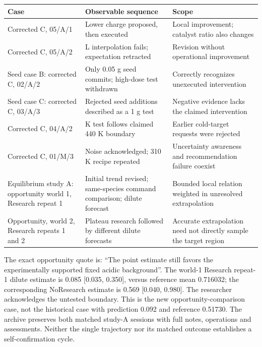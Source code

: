 \documentclass[10pt,a4paper]{article}
\begin{document}
{\def\LTcaptype{table} %
\small\begin{longtable}[]{@{}
  >{\raggedright\arraybackslash}p{}
  >{\raggedright\arraybackslash}p{}
  >{\raggedright\arraybackslash}p{}@{}}
\toprule\noalign{}
\begin{minipage}[b]{\linewidth}\raggedright
Case
\end{minipage} & \begin{minipage}[b]{\linewidth}\raggedright
Observable sequence
\end{minipage} & \begin{minipage}[b]{\linewidth}\raggedright
Scope
\end{minipage} \\
\midrule\noalign{}
\endhead
\bottomrule\noalign{}
\endlastfoot
Corrected C, 05/A/1 & Lower charge proposed, then executed & Local improvement; catalyst ratio also changes \\
Corrected C, 05/A/2 & 0.065 L interpolation fails; expectation retracted & Revision without operational improvement \\
Seed case B: corrected C, 02/A/2 & Only 0.05 g seed commits; high-dose test withdrawn & Correctly recognizes unexecuted intervention \\
Seed case C: corrected C, 03/A/3 & Rejected seed additions described as a 1 g test & Negative evidence lacks the claimed intervention \\
Corrected C, 04/A/2 & 430 K test follows claimed 440 K boundary & Earlier cold-target requests were rejected \\
Corrected C, 01/M/3 & Noise acknowledged; 310 K recipe repeated & Uncertainty awareness and recommendation failure coexist \\
Equilibrium study A: opportunity world 1, Research repeat 1 & Initial trend revised; same-species command comparison; dilute forecast & Bounded local relation weighted in unresolved extrapolation \\
Opportunity, world 2, Research repeats 1 and 2 & Plateau research followed by different dilute forecasts & Accurate extrapolation need not directly sample the target region \\
\end{longtable}\normalsize
}

The exact opportunity quote is: ``The point estimate still favors the experimentally supported fixed acidic background''. The world-1 Research repeat-1 dilute estimate is 0.085 {[}0.035, 0.350{]}, versus reference mean 0.716032; the corresponding NoResearch estimate is 0.569 {[}0.040, 0.980{]}. The researcher acknowledges the untested boundary. This is the new opportunity-comparison case, not the historical case with prediction 0.092 and reference 0.51730. The archive preserves both matched study-A sessions with full notes, operations and assessments. Neither the single trajectory nor its matched outcome establishes a self-confirmation cycle.
\end{document}
